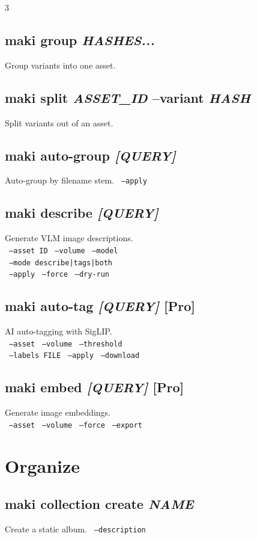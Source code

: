 \documentclass[a4paper,landscape,8pt]{article}
\newcommand{\opt}[1]{\texttt{\scriptsize\color{maki-stone} #1}}
\newcommand{\pro}{\textcolor{maki-teal}{\scriptsize [Pro]}}
\begin{document}
\begin{multicols}{3}
\subsection{maki group \textit{HASHES...}}
Group variants into one asset.

\subsection{maki split \textit{ASSET\_ID} --variant \textit{HASH}}
Split variants out of an asset.

\subsection{maki auto-group \textit{[QUERY]}}
Auto-group by filename stem. \opt{--apply}

\subsection{maki describe \textit{[QUERY]}}
Generate VLM image descriptions. \\
\opt{--asset ID} \opt{--volume} \opt{--model} \\
\opt{--mode describe|tags|both} \\
\opt{--apply} \opt{--force} \opt{--dry-run}

\subsection{maki auto-tag \textit{[QUERY]} \pro}
AI auto-tagging with SigLIP. \\
\opt{--asset} \opt{--volume} \opt{--threshold} \\
\opt{--labels FILE} \opt{--apply} \opt{--download}

\subsection{maki embed \textit{[QUERY]} \pro}
Generate image embeddings. \\
\opt{--asset} \opt{--volume} \opt{--force} \opt{--export}

\section{Organize}

\subsection{maki collection create \textit{NAME}}
Create a static album. \opt{--description}


\end{multicols}
\end{document}
